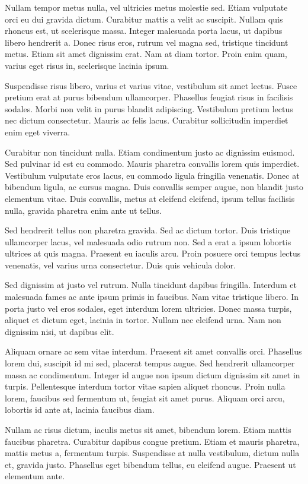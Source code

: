 \documentclass[2pt,a4paper,twoside ]{article}
\begin{document}
\begin{multicols}{2}
Nullam tempor metus nulla, vel ultricies metus molestie sed. Etiam vulputate orci eu dui gravida dictum. Curabitur mattis a velit ac suscipit. Nullam quis rhoncus est, ut scelerisque massa. Integer malesuada porta lacus, ut dapibus libero hendrerit a. Donec risus eros, rutrum vel magna sed, tristique tincidunt metus. Etiam sit amet dignissim erat. Nam at diam tortor. Proin enim quam, varius eget risus in, scelerisque lacinia ipsum.

Suspendisse risus libero, varius et varius vitae, vestibulum sit amet lectus. Fusce pretium erat at purus bibendum ullamcorper. Phasellus feugiat risus in facilisis sodales. Morbi non velit in purus blandit adipiscing. Vestibulum pretium lectus nec dictum consectetur. Mauris ac felis lacus. Curabitur sollicitudin imperdiet enim eget viverra.

Curabitur non tincidunt nulla. Etiam condimentum justo ac dignissim euismod. Sed pulvinar id est eu commodo. Mauris pharetra convallis lorem quis imperdiet. Vestibulum vulputate eros lacus, eu commodo ligula fringilla venenatis. Donec at bibendum ligula, ac cursus magna. Duis convallis semper augue, non blandit justo elementum vitae. Duis convallis, metus at eleifend eleifend, ipsum tellus facilisis nulla, gravida pharetra enim ante ut tellus.

Sed hendrerit tellus non pharetra gravida. Sed ac dictum tortor. Duis tristique ullamcorper lacus, vel malesuada odio rutrum non. Sed a erat a ipsum lobortis ultrices at quis magna. Praesent eu iaculis arcu. Proin posuere orci tempus lectus venenatis, vel varius urna consectetur. Duis quis vehicula dolor.

Sed dignissim at justo vel rutrum. Nulla tincidunt dapibus fringilla. Interdum et malesuada fames ac ante ipsum primis in faucibus. Nam vitae tristique libero. In porta justo vel eros sodales, eget interdum lorem ultricies. Donec massa turpis, aliquet et dictum eget, lacinia in tortor. Nullam nec eleifend urna. Nam non dignissim nisi, ut dapibus elit.

Aliquam ornare ac sem vitae interdum. Praesent sit amet convallis orci. Phasellus lorem dui, suscipit id mi sed, placerat tempus augue. Sed hendrerit ullamcorper massa ac condimentum. Integer id augue non ipsum dictum dignissim sit amet in turpis. Pellentesque interdum tortor vitae sapien aliquet rhoncus. Proin nulla lorem, faucibus sed fermentum ut, feugiat sit amet purus. Aliquam orci arcu, lobortis id ante at, lacinia faucibus diam.

Nullam ac risus dictum, iaculis metus sit amet, bibendum lorem. Etiam mattis faucibus pharetra. Curabitur dapibus congue pretium. Etiam et mauris pharetra, mattis metus a, fermentum turpis. Suspendisse at nulla vestibulum, dictum nulla et, gravida justo. Phasellus eget bibendum tellus, eu eleifend augue. Praesent ut elementum ante.


\end{multicols}
\end{document}
